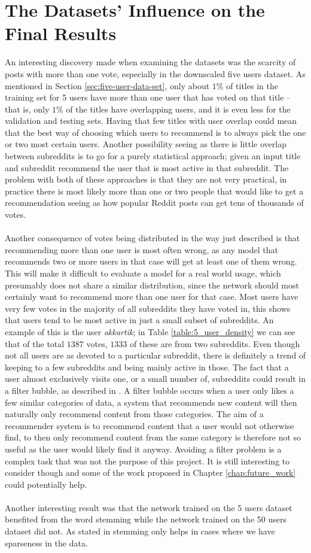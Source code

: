\section{The Datasets' Influence on the Final Results}\label{sec:dataset}
An interesting discovery made when examining the datasets was the scarcity of posts with more than one vote, especially in the downscaled five users dataset. As mentioned in Section  \ref{sec:five-user-data-set}, only about $1\%$ of titles in the training set for 5 users have more than one user that has voted on that title -- that is, only $1\%$ of the titles have overlapping users, and it is even less for the validation and testing sets. Having that few titles with user overlap could mean that the best way of choosing which users to recommend is to always pick the one or two most certain users. Another possibility seeing as there is little overlap between subreddits is to go for a purely statistical approach; given an input title and subreddit recommend the user that is most active in that subreddit. The problem with both of these approaches is that they are not very practical, in practice there is most likely more than one or two people that would like to get a recommendation seeing as how popular Reddit posts can get tens of thousands of votes.
\\\\
Another consequence of votes being distributed in the way just described is that recommending more than one user is most often wrong, as any model that recommends two or more users in that case will get at least one of them wrong. This will make it difficult to evaluate a model for a real world usage, which presumably does not share a similar distribution,  since the network should most certainly want to recommend more than one user for that case. Most users have very few votes in the majority of all subreddits they have voted in, this shows that users tend to be most active in just a small subset of subreddits. An example of this is the user \textit{akkartik}; in Table \ref{table:5_user_density} we can see that of the total $1387$ votes, $1333$ of these are from two subreddits. Even though not all users are as devoted to a particular subreddit, there is definitely a trend of keeping to a few subreddits and being mainly active in those. The fact that a user almost exclusively visits one, or a small number of, subreddits could result in a filter bubble, as described in \parencite{pariser2011filter}. A filter bubble occurs when a user only likes a few similar categories of data, a system that recommends new content will then naturally only recommend content from those categories. The aim of a recommender system is to recommend content that a user would not otherwise find, to then only recommend content from the same category is therefore not so useful as the user would likely find it anyway. Avoiding a filter problem is a complex task that was not the purpose of this project. It is still interesting to consider though and some of the work proposed in Chapter \ref{chap:future_work} could potentially help.
\\\\
Another interesting result was that the network trained on the 5 users dataset benefited from the word stemming while the network trained on the 50 users dataset did not. As stated in \cite{introduction2008Information} stemming only helps in cases where we have sparseness in the data.